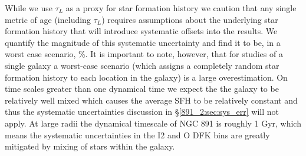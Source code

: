 


While we use $\tau_L$ as a proxy for star formation history we caution
that any single metric of age (including $\tau_L$) requires
assumptions about the underlying star formation history that will
introduce systematic offsets into the results. We quantify the
magnitude of this systematic uncertainty and find it to be, in a worst
case scenario, \%. It is important to note, however, that for
studies of a single galaxy a worst-case scenario (which assigns a
completely random star formation history to each location in the
galaxy) is a large overestimation. On time scales greater than one
dynamical time we expect the the galaxy to be relatively well mixed
which causes the average SFH to be relatively constant and thus the
systematic uncertainties discussion in \S\ref{891_2:sec:sys_err} will
not apply. At large radii the dynamical timescale of NGC 891 is
roughly 1 Gyr, which means the systematic uncertainties in the I2 and
O DFK bins are greatly mitigated by mixing of stars within the galaxy.

